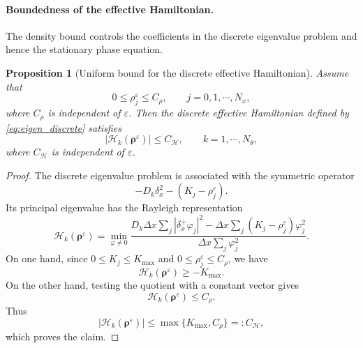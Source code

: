 \documentclass[11pt]{article}
\newtheorem{proposition}{Proposition}[section]
\begin{document}
\paragraph{Boundedness of the effective Hamiltonian.}
The density bound controls the coefficients in the discrete eigenvalue problem
and hence the stationary phase equation.

\begin{proposition}[Uniform bound for the discrete effective Hamiltonian]
\label{prop:stationary_H_bound}
Assume that
\[
    0\le \rho_j^\varepsilon\le C_\rho,
    \qquad j=0, 1,\cdots, N_x,
\]
where \(C_\rho\) is independent of \(\varepsilon\).  Then the discrete
effective Hamiltonian defined by \eqref{eq:eigen_discrete} satisfies
\[
    |\mathcal H_k(\boldsymbol\rho^\varepsilon)|
    \le C_{\mathcal H},
    \qquad k=1,\cdots, N_\theta,
\]
where \(C_{\mathcal H}\) is independent of \(\varepsilon\).
\end{proposition}

\begin{proof}
The discrete eigenvalue problem is associated with the symmetric operator
\[
    -D_k\delta_x^2-(K_j-\rho_j^\varepsilon).
\]
Its principal eigenvalue has the Rayleigh representation
\[
    \mathcal H_k(\boldsymbol\rho^\varepsilon)
    =
    \min_{\varphi\ne0}
    \frac{
        D_k\Delta x\sum_j |\delta_x^+\varphi_j|^2
        -
        \Delta x\sum_j
        (K_j-\rho_j^\varepsilon)\varphi_j^2
    }{
        \Delta x\sum_j\varphi_j^2
    } .
\]
On one hand, since \(0\le K_j\le K_{\max}\) and
\(0\le\rho_j^\varepsilon\le C_\rho\), we have
\[
    \mathcal H_k(\boldsymbol\rho^\varepsilon)\ge -K_{\max}.
\]
On the other hand, testing the quotient with a constant vector gives
\[
    \mathcal H_k(\boldsymbol\rho^\varepsilon)\le C_\rho .
\]
Thus
\[
    |\mathcal H_k(\boldsymbol\rho^\varepsilon)|
    \le
    \max\{K_{\max},C_\rho\}
    =:C_{\mathcal H},
\]
which proves the claim.
\end{proof}
\end{document}

